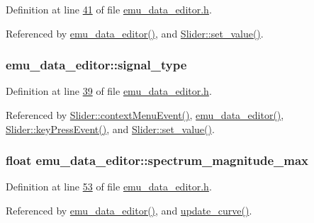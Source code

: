 Definition at line \hyperlink{a00036_source_l00041}{41} of file \hyperlink{a00036_source}{emu\+\_\+data\+\_\+editor.\+h}.



Referenced by \hyperlink{a00035_source_l00012}{emu\+\_\+data\+\_\+editor()}, and \hyperlink{a00046_source_l00102}{Slider\+::set\+\_\+value()}.

\hypertarget{a00004_a070edaec5aee6ba1f5a6866bc32c8ce4}{
\subsubsection[{signal\+\_\+type}]{ emu\+\_\+data\+\_\+editor\+::signal\+\_\+type}}\label{a00004_a070edaec5aee6ba1f5a6866bc32c8ce4}


Definition at line \hyperlink{a00036_source_l00039}{39} of file \hyperlink{a00036_source}{emu\+\_\+data\+\_\+editor.\+h}.



Referenced by \hyperlink{a00046_source_l00309}{Slider\+::context\+Menu\+Event()}, \hyperlink{a00035_source_l00012}{emu\+\_\+data\+\_\+editor()}, \hyperlink{a00046_source_l00219}{Slider\+::key\+Press\+Event()}, and \hyperlink{a00046_source_l00102}{Slider\+::set\+\_\+value()}.

\hypertarget{a00004_ae0119c7dd2179cdcb3ea37adbefdc289}{
\subsubsection[{spectrum\+\_\+magnitude\+\_\+max}]{\setlength{\rightskip}{0pt plus 5cm}float emu\+\_\+data\+\_\+editor\+::spectrum\+\_\+magnitude\+\_\+max}}\label{a00004_ae0119c7dd2179cdcb3ea37adbefdc289}


Definition at line \hyperlink{a00036_source_l00053}{53} of file \hyperlink{a00036_source}{emu\+\_\+data\+\_\+editor.\+h}.



Referenced by \hyperlink{a00035_source_l00012}{emu\+\_\+data\+\_\+editor()}, and \hyperlink{a00035_source_l00284}{update\+\_\+curve()}.

